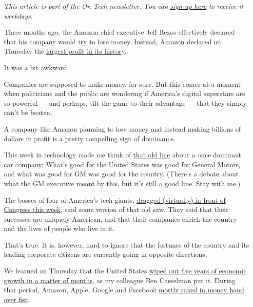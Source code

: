 \emph{This article is part of the On Tech newsletter. You can}
\href{https://www.nytimes.com/newsletters/signup/OT}{\emph{sign up
here}} \emph{to receive it weekdays.}

Three months ago, the Amazon chief executive Jeff Bezos effectively
declared that his company would try to lose money. Instead, Amazon
declared on Thursday the
\href{https://www.nytimes.com/live/2020/07/30/business/stock-market-today-coronavirus/amazons-earnings-double-as-sales-surge}{largest
profit in its history}.

It was a bit awkward.

Companies are supposed to make money, for sure. But this comes at a
moment when politicians and the public are wondering if America's
digital superstars are so powerful --- and perhaps, tilt the game to
their advantage --- that they simply can't be beaten.

A company like Amazon planning to lose money and instead making billions
of dollars in profit is a pretty compelling sign of dominance.

This week in technology made me think of
\href{https://www.nytimes.com/1992/11/06/business/is-gm-fate-still-crucial-to-us.html}{that
old line} about a once dominant car company: What's good for the United
States was good for General Motors, and what was good for GM was good
for the country. (There's a debate about what the GM executive meant by
this, but it's still a good line. Stay with me.)

The bosses of four of America's tech giants,
\href{https://www.nytimes.com/2020/07/29/technology/big-tech-hearing-apple-amazon-facebook-google.html}{dragged
(virtually) in front of Congress this week}, said some version of that
old saw. They said that their successes are uniquely American, and that
their companies enrich the country and the lives of people who live in
it.

That's true. It is, however, hard to ignore that the fortunes of the
country and its leading corporate citizens are currently going in
opposite directions.

We learned on Thursday that the United States
\href{https://www.nytimes.com/2020/07/30/business/economy/q2-gdp-coronavirus-economy.html}{wiped
out five years of economic growth in a matter of months}, as my
colleague Ben Casselman put it. During that period, Amazon, Apple,
Google and Facebook
\href{https://www.nytimes.com/2020/07/30/technology/tech-company-earnings-amazon-apple-facebook-google.html}{mostly
raked in money hand over fist}.

